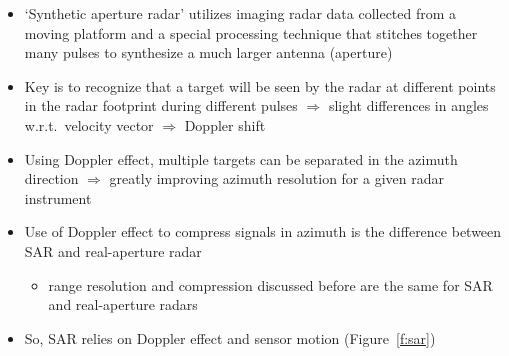 \documentclass[11pt, oneside]{article}
\begin{document}
\begin{itemize}
	\item `Synthetic aperture radar' utilizes imaging radar data collected from a moving platform and a special processing technique that stitches together many pulses to synthesize a much larger antenna (aperture)
	\item Key is to recognize that a target will be seen by the radar at different points in the radar footprint during different pulses $\Rightarrow$ slight differences in angles w.r.t.\ velocity vector $\Rightarrow$ Doppler shift
	\item Using Doppler effect, multiple targets can be separated in the azimuth direction $\Rightarrow$ greatly improving azimuth resolution for a given radar instrument
	\item Use of Doppler effect to compress signals in azimuth is the difference between SAR and real-aperture radar
	\begin{itemize}
		\item[$\hookrightarrow$] range resolution and compression discussed before are the same for SAR and real-aperture radars
	\end{itemize}
	\item So, SAR relies on Doppler effect and sensor motion (Figure~\ref{f:sar})
\end{itemize}
\end{document}
